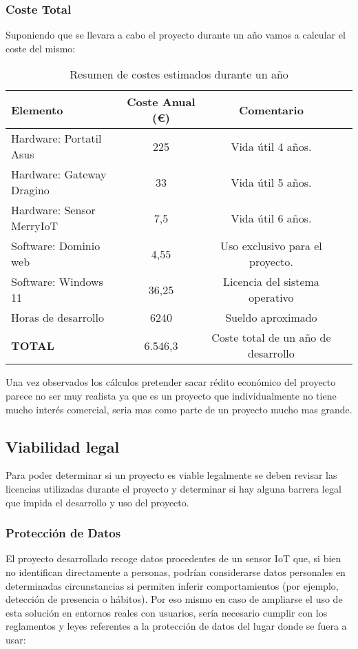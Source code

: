 \subsubsection{Coste Total}
Suponiendo que se llevara a cabo el proyecto durante un año vamos a calcular el coste del mismo:
\begin{table}[H]
\centering
\begin{tabular}{|l|c|c|p{5cm}|}
\hline
\textbf{Elemento} & \textbf{Coste Anual (€)} & \textbf{Comentario} \\
\hline
Hardware: Portatil Asus & 225  & Vida útil 4 años. \\
\hline
Hardware: Gateway Dragino & 33  & Vida útil 5 años. \\
\hline
Hardware: Sensor MerryIoT & 7,5  & Vida útil 6 años. \\
\hline
Software: Dominio web & 4,55 & Uso exclusivo para el proyecto. \\
\hline
Software: Windows 11 & 36,25  & Licencia del sistema operativo \\
\hline
Horas de desarrollo & 6240  & Sueldo aproximado \\
\hline
\textbf{TOTAL} & 6.546,3  & Coste total de un año de desarrollo \\
\hline
\end{tabular}
\caption{Resumen de costes estimados durante un año}
\label{tab:viabilidad-economica}
\end{table}
Una vez observados los cálculos pretender sacar rédito económico del proyecto parece no ser muy realista ya que es un proyecto que individualmente no tiene mucho interés comercial, seria mas como parte de un proyecto mucho mas grande. 

\subsection{Viabilidad legal}
Para poder determinar si un proyecto es viable legalmente se deben revisar las licencias utilizadas durante el proyecto y determinar si hay alguna barrera legal que impida el desarrollo y uso del proyecto.


\subsubsection{Protección de Datos}

El proyecto desarrollado recoge datos procedentes de un sensor IoT que, si bien no identifican directamente a personas, podrían considerarse datos personales en determinadas circunstancias si permiten inferir comportamientos (por ejemplo, detección de presencia o hábitos). Por eso mismo en caso de ampliarse el uso de esta solución en entornos reales con usuarios, sería necesario cumplir con los reglamentos y leyes referentes a la protección de datos del lugar donde se fuera a usar:


